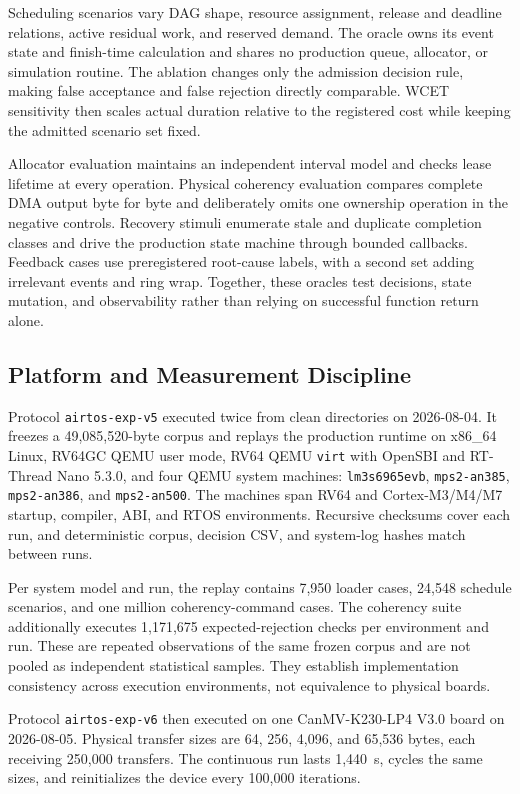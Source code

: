 \documentclass[lettersize,journal]{IEEEtran}
\begin{document}
Scheduling scenarios vary DAG shape, resource assignment, release and
deadline relations, active residual work, and reserved demand. The oracle owns
its event state and finish-time calculation and shares no production queue,
allocator, or simulation routine. The ablation changes only the admission
decision rule, making false acceptance and false rejection directly
comparable. WCET sensitivity then scales actual duration relative to the
registered cost while keeping the admitted scenario set fixed.

Allocator evaluation maintains an independent interval model and checks lease
lifetime at every operation. Physical coherency evaluation compares complete
DMA output byte for byte and deliberately omits one ownership operation in the
negative controls. Recovery stimuli enumerate stale and duplicate completion
classes and drive the production state machine through bounded callbacks.
Feedback cases use preregistered root-cause labels, with a second set adding irrelevant
events and ring wrap. Together, these oracles test decisions, state mutation,
and observability rather than relying on successful function return alone.

\subsection{Platform and Measurement Discipline}
Protocol \texttt{airtos-exp-v5} executed twice from clean directories on
2026-08-04. It freezes a 49,085,520-byte corpus and replays the production
runtime on x86\_64 Linux, RV64GC QEMU user mode, RV64 QEMU \texttt{virt} with
OpenSBI and RT-Thread Nano 5.3.0, and four QEMU system machines:
\texttt{lm3s6965evb}, \texttt{mps2-an385}, \texttt{mps2-an386}, and
\texttt{mps2-an500}. The machines span RV64 and Cortex-M3/M4/M7 startup,
compiler, ABI, and RTOS environments. Recursive checksums cover each run, and
deterministic corpus, decision CSV, and system-log hashes match between runs.

Per system model and run, the replay contains 7,950 loader cases, 24,548
schedule scenarios, and one million coherency-command cases. The coherency
suite additionally executes 1,171,675 expected-rejection checks per environment
and run. These are repeated observations of the same frozen corpus and are not
pooled as independent statistical samples. They establish implementation
consistency across execution environments, not equivalence to physical boards.

Protocol \texttt{airtos-exp-v6} then executed on one CanMV-K230-LP4 V3.0 board
on 2026-08-05. Physical transfer sizes are 64, 256, 4,096, and 65,536 bytes,
each receiving 250,000 transfers. The continuous run lasts 1,440~s, cycles the
same sizes, and reinitializes the device every 100,000 iterations.
\end{document}
